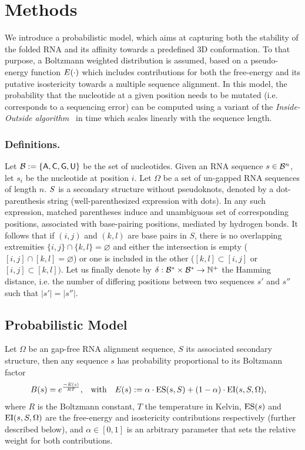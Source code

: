 
\section{Methods}
\label{sec:methods}

We introduce a probabilistic model, which aims at capturing both the stability of the folded RNA and its affinity towards a predefined 3D conformation.
To that purpose, a Boltzmann weighted distribution is assumed, based on a pseudo-energy function $E(\cdot)$ which includes contributions for both the free-energy and its putative isostericity towards a multiple sequence alignment. In this model, the probability that the nucleotide at a given position needs to be mutated (i.e. corresponds to a sequencing error) can be computed using a variant of the \emph{Inside-Outside algorithm}~\cite{Lari1990} in time which scales linearly with the sequence length.


\subsubsection{Definitions.}
Let $\mathcal{B}:=\left\{{\sf{A}},{\sf{C}},{\sf{G}},{\sf{U}}\right\}$ be the set of nucleotides.
Given an RNA sequence $s\in \mathcal{B}^n$, let $s_i$ be the nucleotide at position $i$. Let $\Omega$ be a set of un-gapped RNA sequences of
length $n$. $S$ is a secondary structure without pseudoknots, denoted by a dot-parenthesis string (well-parenthesized expression with dots). In any such expression, matched parentheses induce and unambiguous set of corresponding positions, associated with base-pairing positions, mediated by hydrogen bonds. It follows that if $(i,j)$ and $(k,l)$ are base pairs in $S$, there is no overlapping extremities  $\{i,j\}\cap \{k,l\}=\varnothing$ and either the intersection is empty 
 ($[i,j]\cap[k,l]=\varnothing$) or one is included in the other ($[k,l]\subset[i,j]$ or 
 $[i,j]\subset[k,l])$. Let us finally denote by $\delta: \mathcal{B}^*\times \mathcal{B}^* \to \mathbb{N}^+$ the Hamming distance, i.e. the number of differing positions between two sequences $s'$ and $s''$ such that $|s'|=|s''|$.




\subsection{Probabilistic Model}
Let $\Omega$ be an gap-free RNA alignment sequence, $S$ its associated secondary structure, 
then any sequence $s$ has probability proportional to its Boltzmann factor
\begin{align*}
  {B}(s) &= e^\frac{-E(s)}{RT}, &&\text{with}&E(s)&:=\alpha\cdot\text{ES}(s,S)+(1-\alpha)\cdot\text{EI}(s,S,\Omega),
\end{align*}
where $R$ is the Boltzmann constant, $T$ the temperature in Kelvin, $\text{ES}(s)$ and $\text{EI}(s,S,\Omega)$ 
are the free-energy and isostericity contributions respectively (further described below), and $\alpha\in[0,1]$ is an arbitrary parameter that sets the relative weight for both contributions.

